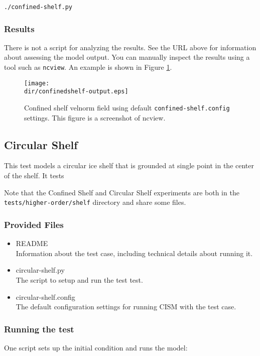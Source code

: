 \texttt{./confined-shelf.py}

\subsubsection{Results}
There is not a script for analyzing the results.  See the URL above for information 
about assessing the model output.
You can manually inspect the results using a tool such as \texttt{ncview}.
An example is shown in Figure \ref{fig:confinedshelf-results}.

\begin{figure}[H!]
	\centering
	\texttt{[image: \\dir/confinedshelf-output.eps]}
	\caption{Confined shelf velnorm field using default \texttt{confined-shelf.config} settings. This figure is a screenshot of ncview.}
	\label{fig:confinedshelf-results}
\end{figure}
\FloatBarrier

\subsection{Circular Shelf}
This test models a circular ice shelf that is grounded at single point in the center
of the shelf.  It tests 

Note that the Confined Shelf and Circular Shelf experiments are both in the 
\texttt{tests/higher-order/shelf} directory and share some files.

\subsubsection{Provided Files}

\begin{itemize}
	\item README \\
		Information about the test case, including technical details about running it.
	\item circular-shelf.py \\
		The script to setup and run the test test.
	\item circular-shelf.config \\
  The default configuration settings for running CISM with the test case.
\end{itemize}

\subsubsection{Running the test}
One script sets up the initial condition and runs the model:

